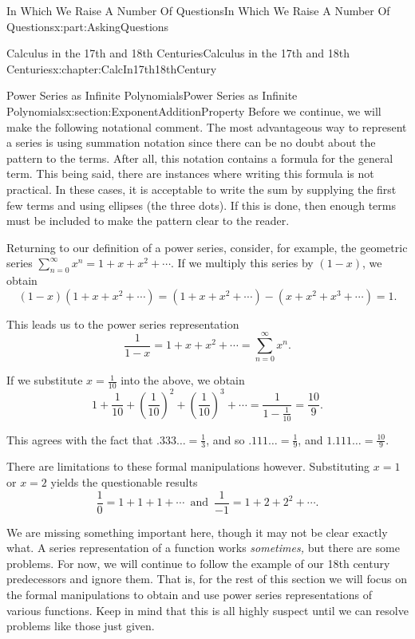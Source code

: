 \documentclass[oneside,10pt,]{book}
\numberwithin{equation}{section}
\begin{document}
\begin{partptx}{In Which We Raise A Number Of Questions}{}{In Which We Raise A Number Of Questions}{}{}{x:part:AskingQuestions}
\begin{chapterptx}{Calculus in the 17th and 18th Centuries}{}{Calculus in the 17th and 18th Centuries}{}{}{x:chapter:CalcIn17th18thCentury}
\begin{sectionptx}{Power Series as Infinite Polynomials}{}{Power Series as Infinite Polynomials}{}{}{x:section:ExponentAdditionProperty}
Before we continue, we will make the following notational comment. The most advantageous way to represent a series is using summation notation since there can be no doubt about the pattern to the terms. After all, this notation contains a formula for the general term. This being said, there are instances where writing this formula is not practical. In these cases, it is acceptable to write the sum by supplying the first few terms and using ellipses (the three dots). If this is done, then enough terms must be included to make the pattern clear to the reader.%
\par
Returning to our definition of a power series, consider, for example, the  geometric series \(\sum_{n=0}^\infty x^n=1+x+x^2+\cdots\). If we multiply this series by \((1-x)\), we obtain%
\begin{equation*}
(1-x)(1+x+x^2+\cdots)=(1+x+x^2+\cdots)-(x+x^2+x^3+\cdots)=1\text{.}
\end{equation*}
%
\par
This leads us to the power series representation%
\begin{equation*}
\frac{1}{1-x}=1+x+x^2+\cdots=\sum_{n=0}^\infty x^n\text{.}
\end{equation*}
%
\par
If we substitute \(x=\frac{1}{10}\) into the above, we obtain%
\begin{equation*}
1+\frac{1}{10}+\left(\frac{1}{10}\right)^2+\left(\frac{1}{10}\right)^3+ \cdots=\frac{1}{1-\frac{1}{10}}=\frac{10}{9}\text{.}
\end{equation*}
%
\par
This agrees with the fact that \(.333\ldots=\frac{1}{3}\), and so \(.111\ldots=\frac{1}{9}\), and \(1.111\ldots=\frac{10}{9}\).%
\par
There are limitations to these formal manipulations however. Substituting \(x=1\) or \(x=2\) yields the questionable results%
\begin{equation*}
\frac{1}{0}=1+1+1+\cdots\,\text{  and  }  \,\frac{1}{-1}=1+2+2^2+\cdots\text{.}
\end{equation*}
%
\par
We are missing something important here, though it may not be clear exactly what. A series representation of a function works \emph{sometimes,} but there are some problems. For now, we will continue to follow the example of our 18th century predecessors and ignore them. That is, for the rest of this section we will focus on the formal manipulations to obtain and use power series representations of various functions. Keep in mind that this is all highly suspect until we can resolve problems like those just given.%

\end{sectionptx}
\end{chapterptx}
\end{partptx}
\end{document}

